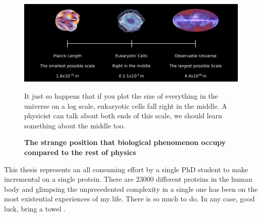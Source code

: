 \begin{figure}
	\begin{center}
		\includegraphics[width=1.0\textwidth]{figures/scales.png}
	\end{center}
	\captionsetup{singlelinecheck = false, justification=raggedright}
	\caption[The strange position that biological phenomenon occupy compared to the rest of physics] {\textbf{The strange position that biological phenomenon occupy compared to the rest of physics}}{It just so happens that if you plot the size of everything  in the universe on a log scale, eukaryotic cells fall right in the middle. A physicist can talk about both ends of this scale, we should learn something about the middle too.}
	\label{biology_scales}
\end{figure}

This thesis represents an all consuming effort by a single PhD student to make incremental on a single protein. There are 23000 different proteins in the human body and glimpsing the unprecedented complexity in a single one has been on the most existential experiences of my life. There is so much to do. In any case, good luck, bring a towel \cite{adams1979}. 
